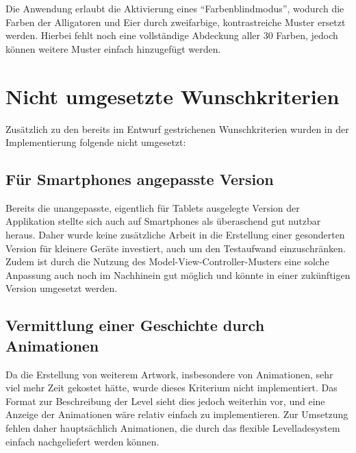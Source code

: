 Die Anwendung erlaubt die Aktivierung eines "`Farbenblindmodus"', wodurch die Farben der Alligatoren und Eier durch zweifarbige, kontrastreiche Muster ersetzt werden.
Hierbei fehlt noch eine vollständige Abdeckung aller 30 Farben, jedoch können weitere Muster einfach hinzugefügt werden.

\section{Nicht umgesetzte Wunschkriterien}

Zusätzlich zu den bereits im Entwurf gestrichenen Wunschkriterien wurden in der Implementierung folgende nicht umgesetzt:

\subsection{Für Smartphones angepasste Version}

Bereits die unangepasste, eigentlich für Tablets ausgelegte Version der Applikation stellte sich auch auf Smartphones als überaschend gut nutzbar heraus.
Daher wurde keine zusätzliche Arbeit in die Erstellung einer gesonderten Version für kleinere Geräte investiert, auch um den Testaufwand einzuschränken.
Zudem ist durch die Nutzung des Model-View-Controller-Musters eine solche Anpassung auch noch im Nachhinein gut möglich und könnte in einer zukünftigen Version umgesetzt werden.

\subsection{Vermittlung einer Geschichte durch Animationen}

Da die Erstellung von weiterem Artwork, insbesondere von Animationen, sehr viel mehr Zeit gekostet hätte, wurde dieses Kriterium nicht implementiert.
Das Format zur Beschreibung der Level sieht dies jedoch weiterhin vor, und eine Anzeige der Animationen wäre relativ einfach zu implementieren.
Zur Umsetzung fehlen daher hauptsächlich Animationen, die durch das flexible Levelladesystem einfach nachgeliefert werden können.
